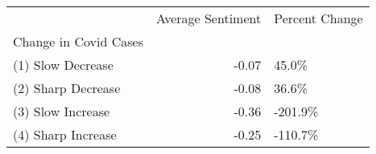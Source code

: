 \begin{tabular}{lrl}
\toprule
{} &  Average Sentiment & Percent Change \\
Change in Covid Cases &                    &                \\
\midrule
(1) Slow  Decrease    &              -0.07 &          45.0\% \\
(2) Sharp Decrease    &              -0.08 &          36.6\% \\
(3) Slow  Increase    &              -0.36 &        -201.9\% \\
(4) Sharp Increase    &              -0.25 &        -110.7\% \\
\bottomrule
\end{tabular}

